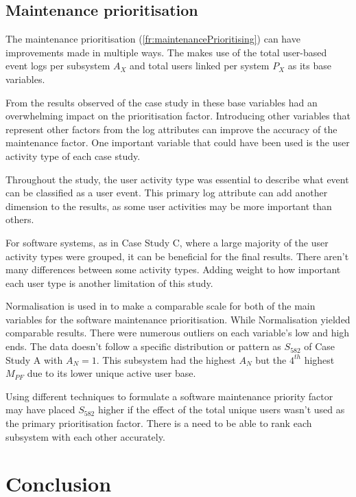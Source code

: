 \subsection{Maintenance prioritisation}
The maintenance prioritisation (\ref{fr:maintenancePrioritising}) can have improvements made in
multiple ways. The
 makes use
of the total user-based event logs per subsystem $A_X$ and total users linked per system $P_X$ as
its base variables.\par From the results observed of the case study in 
these base variables had an overwhelming impact on the prioritisation factor. Introducing other
variables that represent other factors from the log attributes can improve the accuracy of the
maintenance factor. One important variable that could have been used is the user activity type of
each case study.\par Throughout the study, the user activity type was essential to describe what
event can be classified as a user event. This primary log attribute can add another dimension to the
results, as some user activities may be more important than others. \par For software systems, as
in Case Study C, where a large majority of the user activity types were grouped, it can be beneficial
for the final results. There aren't many differences between some activity types. Adding weight to
how important each user type is another limitation of this study.\par Normalisation is used in
 to make a
comparable scale for both of the main variables for the software maintenance prioritisation. While
Normalisation yielded comparable results. There were numerous outliers on each variable's low and
high ends. The data doesn't follow a specific distribution or pattern as $S_{582}$ of Case Study A
with $A_N=1$. This subsystem had the highest $A_N$ but the $4^{th}$ highest $M_{PF}$ due to
its lower unique active user base.\par Using different techniques to formulate a software
maintenance priority factor may have placed $S_{582}$ higher if the effect of the total unique users
wasn't used as the primary prioritisation factor. There is a need to be able to rank each subsystem
with each other accurately.

\section{Conclusion}

